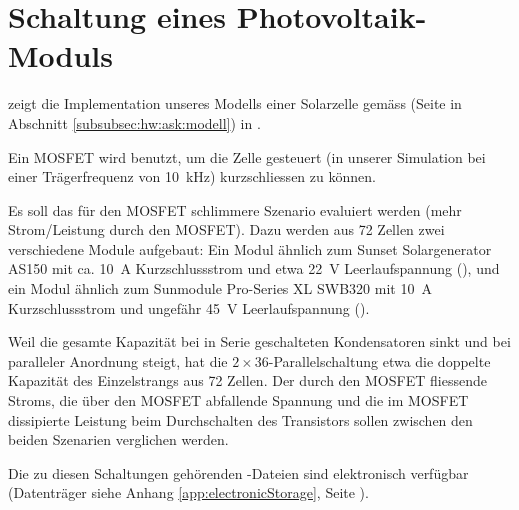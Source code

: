 \chapter{ Schaltung eines Photovoltaik-Moduls}
\label{app:simu:module}

   zeigt   die  Implementation   unseres   Modells
einer     Solarzelle      gem\"ass          (Seite
\pageref{fig:circuit:solarCell} in Abschnitt \ref{subsubsec:hw:ask:modell}) in
.

Ein MOSFET  wird benutzt, um  die Zelle  gesteuert (in unserer  Simulation bei
einer Tr\"agerfrequenz von \SI{10}{\kilo\hertz}) kurzschliessen zu k\"onnen.

Es    soll   das    f\"ur   den    MOSFET   schlimmere    Szenario   evaluiert
werden   (mehr    Strom/Leistung   durch    den   MOSFET). Dazu
werden   aus  72   Zellen  zwei   verschiedene  Module   aufgebaut: Ein  Modul
\"ahnlich    zum    Sunset   Solargenerator    AS150    \cite{ref:solar:as150}
mit    ca. \SI{10}{\ampere}   Kurzschlussstrom    und   etwa    \SI{22}{\volt}
Leerlaufspannung  (),  und  ein  Modul
\"ahnlich  zum Sunmodule  Pro-Series  XL SWB320  \cite{ref:solar:sunmodulePro}
mit   \SI{10}{\ampere}   Kurzschlussstrom    und   ungef\"ahr   \SI{45}{\volt}
Leerlaufspannung ().

Weil die gesamte Kapazit\"at bei in Serie geschalteten Kondensatoren sinkt und
bei  paralleler  Anordnung steigt,  hat  die  $2 \times  36$-Parallelschaltung
 etwa die doppelte Kapazit\"at des Einzelstrangs
aus 72 Zellen. Der  durch den MOSFET fliessende Stroms, die  \"uber den MOSFET
abfallende Spannung und die im  MOSFET dissipierte Leistung beim Durchschalten
des Transistors sollen zwischen den beiden Szenarien verglichen werden.

Die zu  diesen Schaltungen geh\"orenden -Dateien  sind elektronisch
verf\"ugbar  (Datentr\"ager  siehe Anhang  \ref{app:electronicStorage},  Seite
\pageref{app:electronicStorage}).


